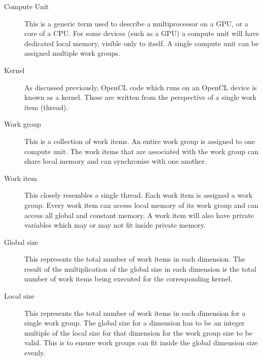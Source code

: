 \begin{description}

\item[Compute Unit] This is a generic term used to describe a multiprocessor on
a GPU, or a core of a CPU. For some devices (such as a GPU) a compute unit will
have dedicated local memory, visible only to itself. A single compute unit can
be assigned multiple work groups.

\item[Kernel] As discussed previously, OpenCL code which runs on an OpenCL
device is known as a kernel. These are written from the perspective of a single
work item (thread).

\item[Work group] This is a collection of work items. An entire work group is
assigned to one compute unit. The work items that are associated with the work
group can share local memory and can synchronise with one another.

\item[Work item] This closely resembles a single thread. Each work item is
assigned a work group. Every work item can access local memory of its work
group and can access all global and constant memory. A work item will also
have private variables which may or may not fit inside private memory.

\item[Global size] This represents the total number of work items in each
dimension. The result of the multiplication of the global size in each dimension
is the total number of work items being executed for the corresponding kernel.

\item[Local size] This represents the total number of work items in each
dimension for a single work group. The global size for a dimension has to be an
integer multiple of the local size for that dimension for the work group size
to be valid. This is to ensure work groups can fit inside the global dimension
size evenly.

\end{description}

